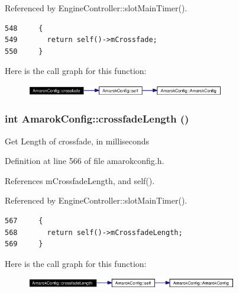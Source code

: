 Referenced by Engine\-Controller::slot\-Main\-Timer().



\footnotesize\begin{verbatim}548     {
549       return self()->mCrossfade;
550     }
\end{verbatim}\normalsize 


Here is the call graph for this function:\begin{figure}[H]
\begin{center}
\leavevmode
\includegraphics[width=245pt]{classAmarokConfig_AmarokConfige56_cgraph}
\end{center}
\end{figure}
\subsubsection{\setlength{\rightskip}{0pt plus 5cm}int Amarok\-Config::crossfade\-Length ()\hspace{0.3cm}{\tt  [inline, static]}}\label{classAmarokConfig_AmarokConfige58}


Get Length of crossfade, in milliseconds 

Definition at line 566 of file amarokconfig.h.

References m\-Crossfade\-Length, and self().

Referenced by Engine\-Controller::slot\-Main\-Timer().



\footnotesize\begin{verbatim}567     {
568       return self()->mCrossfadeLength;
569     }
\end{verbatim}\normalsize 


Here is the call graph for this function:\begin{figure}[H]
\begin{center}
\leavevmode
\includegraphics[width=261pt]{classAmarokConfig_AmarokConfige58_cgraph}
\end{center}
\end{figure}

